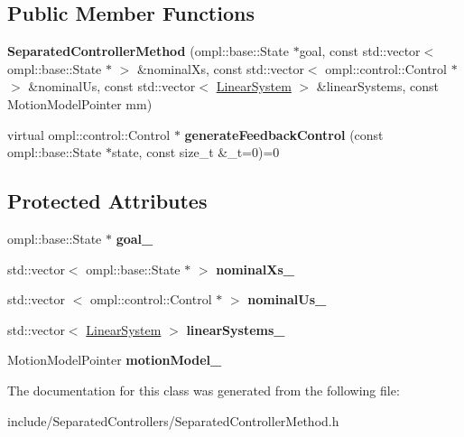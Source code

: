 \subsection*{\-Public \-Member \-Functions}
\begin{DoxyCompactItemize}
\item 
\hypertarget{class_separated_controller_method_a972840f44e5e93b293bba9b2a5a2f8db}{{\bfseries \-Separated\-Controller\-Method} (ompl\-::base\-::\-State $\ast$goal, const std\-::vector$<$ ompl\-::base\-::\-State $\ast$ $>$ \&nominal\-Xs, const std\-::vector$<$ ompl\-::control\-::\-Control $\ast$ $>$ \&nominal\-Us, const std\-::vector$<$ \hyperlink{class_linear_system}{\-Linear\-System} $>$ \&linear\-Systems, const \-Motion\-Model\-Pointer mm)}\label{class_separated_controller_method_a972840f44e5e93b293bba9b2a5a2f8db}

\item 
\hypertarget{class_separated_controller_method_a1a69b57856c903834a4f353ebd561749}{virtual ompl\-::control\-::\-Control $\ast$ {\bfseries generate\-Feedback\-Control} (const ompl\-::base\-::\-State $\ast$state, const size\-\_\-t \&\-\_\-t=0)=0}\label{class_separated_controller_method_a1a69b57856c903834a4f353ebd561749}

\end{DoxyCompactItemize}
\subsection*{\-Protected \-Attributes}
\begin{DoxyCompactItemize}
\item 
\hypertarget{class_separated_controller_method_ac5fa2b730632d0367986649d664e7640}{ompl\-::base\-::\-State $\ast$ {\bfseries goal\-\_\-}}\label{class_separated_controller_method_ac5fa2b730632d0367986649d664e7640}

\item 
\hypertarget{class_separated_controller_method_a77c380ed4f2af1ca89f3856cd8ad6435}{std\-::vector$<$ ompl\-::base\-::\-State $\ast$ $>$ {\bfseries nominal\-Xs\-\_\-}}\label{class_separated_controller_method_a77c380ed4f2af1ca89f3856cd8ad6435}

\item 
\hypertarget{class_separated_controller_method_a822729a081bfc3438c4632ad99d418d4}{std\-::vector\*
$<$ ompl\-::control\-::\-Control $\ast$ $>$ {\bfseries nominal\-Us\-\_\-}}\label{class_separated_controller_method_a822729a081bfc3438c4632ad99d418d4}

\item 
\hypertarget{class_separated_controller_method_a977cb3b7a14a072d10b4529875737ebd}{std\-::vector$<$ \hyperlink{class_linear_system}{\-Linear\-System} $>$ {\bfseries linear\-Systems\-\_\-}}\label{class_separated_controller_method_a977cb3b7a14a072d10b4529875737ebd}

\item 
\hypertarget{class_separated_controller_method_ae23167d348557320997ecb359bb82403}{\-Motion\-Model\-Pointer {\bfseries motion\-Model\-\_\-}}\label{class_separated_controller_method_ae23167d348557320997ecb359bb82403}

\end{DoxyCompactItemize}


\-The documentation for this class was generated from the following file\-:\begin{DoxyCompactItemize}
\item 
include/\-Separated\-Controllers/\-Separated\-Controller\-Method.\-h\end{DoxyCompactItemize}
